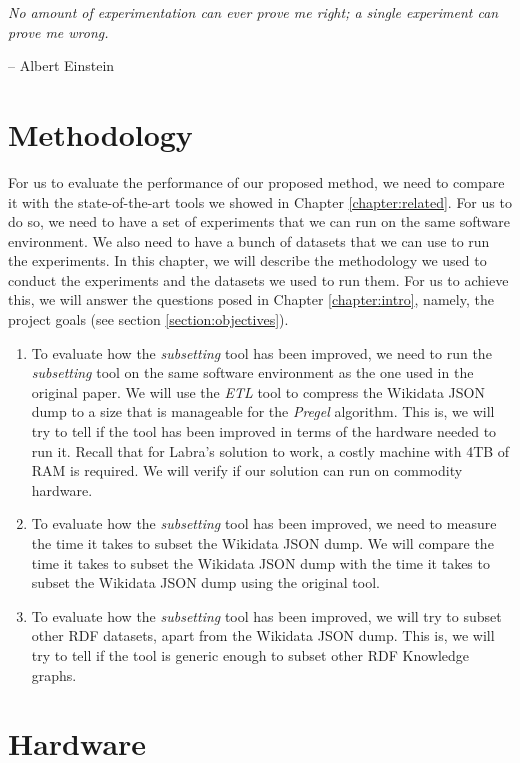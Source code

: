 \epigraph{\textit{No amount of experimentation can ever prove me right; a single experiment can prove me wrong.}}{-- \textup{Albert Einstein}}

\section{Methodology}

For us to evaluate the performance of our proposed method, we need to compare it with the state-of-the-art tools we showed in Chapter \ref{chapter:related}. For us to do so, we need to have a set of experiments that we can run on the same software environment. We also need to have a bunch of datasets that we can use to run the experiments. In this chapter, we will describe the methodology we used to conduct the experiments and the datasets we used to run them. For us to achieve this, we will answer the questions posed in Chapter \ref{chapter:intro}, namely, the project goals (see section \ref{section:objectives}).

\begin{enumerate}
    \itemsep0.5em
    \item To evaluate how the \textit{subsetting} tool has been improved, we need to run the \textit{subsetting} tool on the same software environment as the one used in the original paper. We will use the \textit{ETL} tool to compress the Wikidata JSON dump to a size that is manageable for the \textit{Pregel} algorithm. This is, we will try to tell if the tool has been improved in terms of the hardware needed to run it. Recall that for Labra's \cite{https://doi.org/10.48550/arxiv.2110.11709} solution to work, a costly machine with 4TB of RAM is required. We will verify if our solution can run on commodity hardware.
    \item To evaluate how the \textit{subsetting} tool has been improved, we need to measure the time it takes to subset the Wikidata JSON dump. We will compare the time it takes to subset the Wikidata JSON dump with the time it takes to subset the Wikidata JSON dump using the original tool.
    \item To evaluate how the \textit{subsetting} tool has been improved, we will try to subset other RDF datasets, apart from the Wikidata JSON dump. This is, we will try to tell if the tool is generic enough to subset other RDF Knowledge graphs.
\end{enumerate}

\section{Hardware}

